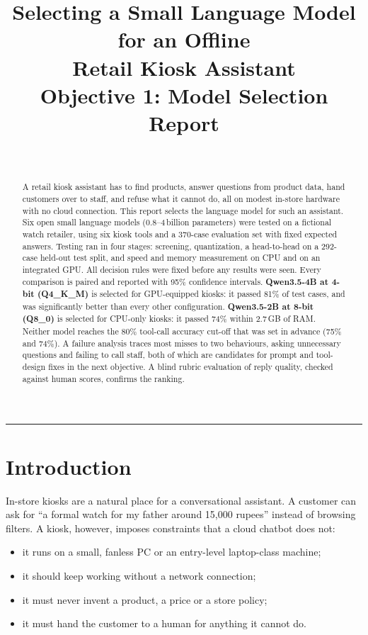 \documentclass[11pt,a4paper]{article}
\title{\textbf{Selecting a Small Language Model for an Offline\\Retail Kiosk Assistant}\\[4pt]
\large Objective 1: Model Selection Report}
\author{\reportauthor\\\small\reportaffil}
\date{\reportdate}
\begin{document}
\maketitle

\begin{abstract}
\noindent
A retail kiosk assistant has to find products, answer questions from product data, hand customers over to staff, and
refuse what it cannot do, all on modest in-store hardware with no cloud connection. This report selects the language
model for such an assistant. Six open small language models (0.8--4\,billion parameters) were tested on a
fictional watch retailer, using six kiosk tools and a 370-case evaluation set with fixed expected answers. Testing ran in
four stages: screening, quantization, a head-to-head on a 292-case held-out test split, and speed and memory
measurement on CPU and on an integrated GPU. All decision rules were fixed before any results were seen. Every
comparison is paired and reported with 95\% confidence intervals.
\textbf{Qwen3.5-4B at 4-bit (Q4\_K\_M)} is selected for GPU-equipped kiosks: it passed 81\% of test cases, and was
significantly better than every other configuration. \textbf{Qwen3.5-2B at 8-bit (Q8\_0)} is selected for CPU-only
kiosks: it passed 74\% within 2.7\,GB of RAM.
Neither model reaches the 80\% tool-call accuracy cut-off that was set in advance (75\% and 74\%). A failure analysis
traces most misses to two behaviours, asking unnecessary questions and failing to call staff, both of which are
candidates for prompt and tool-design fixes in the next objective. A blind rubric evaluation of reply quality,
checked against human scores, confirms the ranking.
\end{abstract}

\tableofcontents
\vspace{6pt}
\hrule

\section{Introduction}

In-store kiosks are a natural place for a conversational assistant. A customer can ask for ``a formal watch for my
father around 15,000 rupees'' instead of browsing filters. A kiosk, however, imposes constraints that a cloud chatbot
does not:
\begin{itemize}
  \item it runs on a small, fanless PC or an entry-level laptop-class machine;
  \item it should keep working without a network connection;
  \item it must never invent a product, a price or a store policy;
  \item it must hand the customer to a human for anything it cannot do.
\end{itemize}
\end{document}
